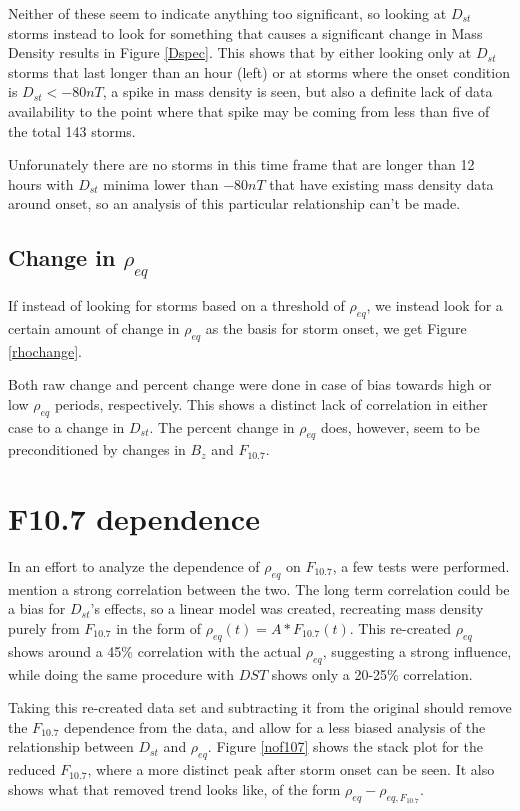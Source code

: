 \documentclass[10pt,twocolumn]{article}
\begin{document}
Neither of these seem to indicate anything too significant, so looking at $D_{st}$ storms instead to look for something that causes a significant change in Mass Density results in Figure \ref{Dspec}. This shows that by either looking only at $D_{st}$ storms that last longer than an hour (left) or at storms where the onset condition is $D_{st}<-80nT$, a spike in mass density is seen, but also a definite lack of data availability to the point where that spike may be coming from less than five of the total 143 storms. 



Unforunately there are no storms in this time frame that are longer than 12 hours with $D_{st}$ minima lower than $-80nT$ that have existing mass density data around onset, so an analysis of this particular relationship can't be made.

\subsection{Change in $\rho_{eq}$}
If instead of looking for storms based on a threshold of $\rho_{eq}$, we instead look for a certain amount of change in $\rho_{eq}$ as the basis for storm onset, we get Figure \ref{rhochange}.



Both raw change and percent change were done in case of bias towards high or low $\rho_{eq}$ periods, respectively. This shows a distinct lack of correlation in either case to a change in $D_{st}$. The percent change in $\rho_{eq}$ does, however, seem to be preconditioned by changes in $B_z$ and $F_{10.7}$.



\section{F10.7 dependence}
In an effort to analyze the dependence of $\rho_{eq}$ on $F_{10.7}$, a few tests were performed. \cite{Takahashi2010} mention a strong correlation between the two. The long term correlation could be a bias for $D_{st}$'s effects, so a linear model was created, recreating mass density purely from $F_{10.7}$ in the form of $\rho_{eq}(t)=A*F_{10.7}(t)$. This re-created $\rho_{eq}$ shows around a 45\% correlation with the actual $\rho_{eq}$, suggesting a strong influence, while doing the same procedure with $DST$ shows only a 20-25\% correlation. 

Taking this re-created data set and subtracting it from the original should remove the $F_{10.7}$ dependence from the data, and allow for a less biased analysis of the relationship between $D_{st}$ and $\rho_{eq}$. Figure \ref{nof107} shows the stack plot for the reduced $F_{10.7}$, where a more distinct peak after storm onset can be seen. It also shows what that removed trend looks like, of the form $\rho_{eq}-\rho_{eq,F_{10.7}}$.
\end{document}
